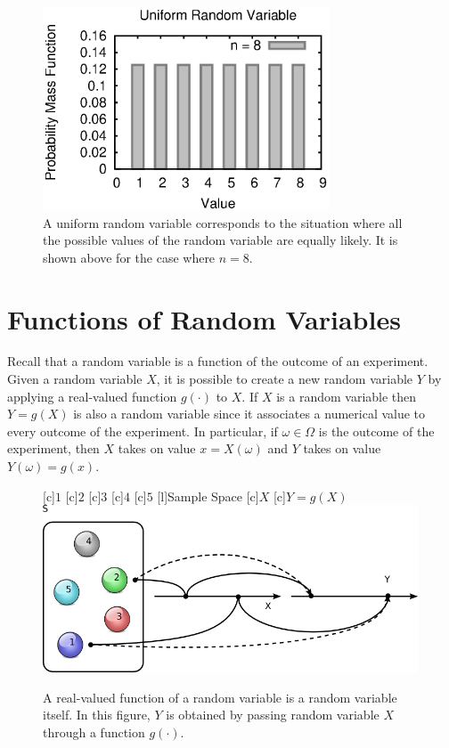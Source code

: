 \begin{figure}[ht]
\begin{center}
\includegraphics[width=8.5cm]{Figures/5chapter/uniform_pmf}
\end{center}
\caption{A uniform random variable corresponds to the situation where all the possible values of the random variable are equally likely.
It is shown above for the case where $n = 8$.}
\end{figure}


\section{Functions of Random Variables}
\label{subsection:FunctionDiscreteRV}

Recall that a random variable is a function of the outcome of an experiment.
Given a random variable $X$, it is possible to create a new random variable $Y$ by applying a real-valued function $g(\cdot)$ to $X$.
If $X$ is a random variable then $Y = g(X)$ is also a random variable since it associates a numerical value to every outcome of the experiment.
In particular, if $\omega \in \Omega$ is the outcome of the experiment, then $X$ takes on value $x = X(\omega)$ and $Y$ takes on value $Y(\omega) = g(x)$.

\begin{figure}[htb!]
\begin{center}
\begin{psfrags}
[c]{$1$}
[c]{$2$}
[c]{$3$}
[c]{$4$}
[c]{$5$}
[l]{Sample Space}
[c]{$X$}
[c]{$Y = g(X)$}
\includegraphics[height=4.97cm]{Figures/5Chapter/fcn}
\end{psfrags}
\caption{A real-valued function of a random variable is a random variable itself.
In this figure, $Y$ is obtained by passing random variable $X$ through a function $g (\cdot)$.}
\end{center}
\end{figure}

